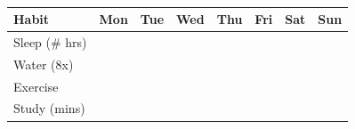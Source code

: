 \documentclass[11pt,a4paper]{article}
\begin{document}
\vspace{8mm}
\\[4pt]
\begin{tabular}{|l|c|c|c|c|c|c|c|}
\hline
Habit & Mon & Tue & Wed & Thu & Fri & Sat & Sun \\
\hline
Sleep (\# hrs) & & & & & & & \\
\hline
Water (8x) & & & & & & & \\
\hline
Exercise & & & & & & & \\
\hline
Study (mins) & & & & & & & \\
\hline
\end{tabular}
\end{document}
